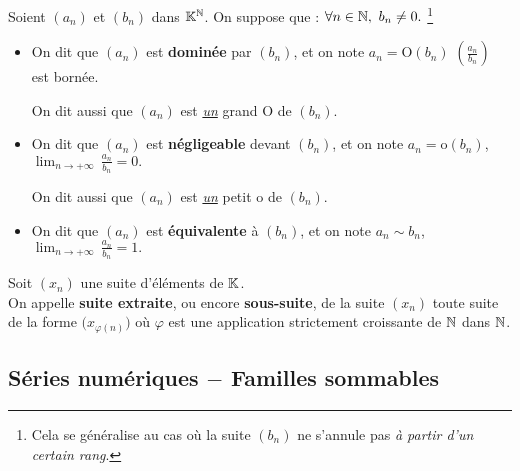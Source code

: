 \vspace{1.3cm}

\noindent Soient $(a_n)$ et $(b_n)$ dans $\mathbb{K}^{\mathbb{N}}$. On suppose que : \(\forall n\in \mathbb{N},\ b_n\neq 0 . \ \)\footnote{Cela se généralise au cas où la suite $(b_n)$ ne s'annule pas \emph{à partir d'un certain rang}.}\vspace{-0.2cm}
\begin{itemize}[leftmargin=0.5cm, label=•]
    \item On dit que $(a_n)$ est \textbf{dominée} par $(b_n)$, et on note \(a_n=\text{O}(b_n)\) \ssi \(\displaystyle \left( \frac{a_n}{b_n} \right)\) est bornée.\\
    \begin{small}
        On dit aussi que \((a_n)\) est \underline{\emph{un}} grand O de \((b_n)\).
    \end{small}
    \vspace{0.1cm}
    
    \item On dit que $(a_n)$ est \textbf{négligeable} devant $(b_n)$, et on note \(a_n=\text{o}(b_n)\), \ssi \( \displaystyle \lim_{n\to+\infty}\,\frac{a_n}{b_n}=0.  \)\\
    \begin{small}
        On dit aussi que \((a_n)\) est \underline{\emph{un}} petit o de \((b_n)\).
    \end{small}
    \vspace{0.1cm}
    
    \item On dit que \((a_n)\) est \textbf{équivalente} à \((b_n)\), et on note \(a_n\sim b_n\), \ssi \( \displaystyle \lim_{n\to+\infty}\,\frac{a_n}{b_n}=1. \) 
\end{itemize}

\vspace{1.3cm}

Soit \((x_n)\) une suite d'éléments de \(\mathbb{K}\). \\
On appelle \textbf{suite extraite}, ou encore \textbf{sous-suite}, de la suite \((x_n)\) toute suite de la forme \(\displaystyle \bigl(x_{\varphi (n)}\bigr)\) où \(\varphi\) est une application strictement croissante de \(\mathbb{N}\) dans \(\mathbb{N}\).

\newpage

\subsection{Séries numériques $-$ Familles sommables}

